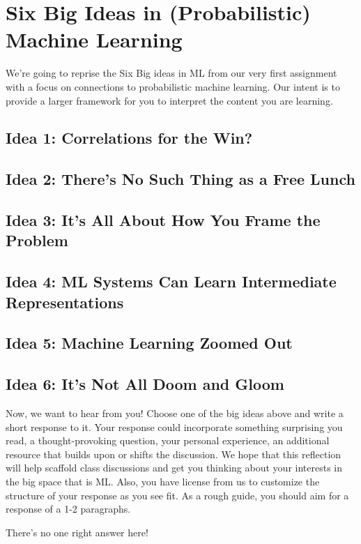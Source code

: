 \documentclass[assignment01_Solutions]{subfiles}
\begin{document}
\section{Six Big Ideas in (Probabilistic) Machine Learning}
We're going to reprise the Six Big ideas in ML from our very first assignment with a focus on connections to probabilistic machine learning.  Our intent is to provide a larger framework for you to interpret the content you are learning.


\subsection*{Idea 1: Correlations for the Win?}

\subsection*{Idea 2: There's No Such Thing as a Free Lunch}

\subsection*{Idea 3: It's All About How You Frame the Problem}

\subsection*{Idea 4: ML Systems Can Learn Intermediate Representations}

\subsection*{Idea 5: Machine Learning Zoomed Out}

\subsection*{Idea 6: It's Not All Doom and Gloom}

\begin{exercise}
Now, we want to hear from you!  
Choose one of the big ideas above and write a short response to it.  Your response could incorporate something surprising you read, a thought-provoking question, your personal experience, an additional resource that builds upon or shifts the discussion.  We hope that this reflection will help scaffold class discussions and get you thinking about your interests in the big space that is ML.  Also, you have license from us to customize the structure of your response as you see fit.  As a rough guide, you should aim for a response of a 1-2 paragraphs.

\begin{boxedsolution}
There's no one right answer here!
\end{boxedsolution}
\end{exercise}
\end{document}
